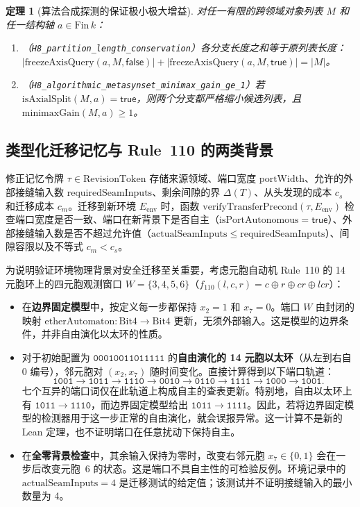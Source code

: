 \documentclass[11pt,a4paper]{article}
\theoremstyle{cleanthm}
\newtheorem{theorem}{定理}[section]
\theoremstyle{cleandef}
\begin{document}
\begin{theorem}[算法合成探测的保证极小极大增益]
\label{thm:h8_metasynset}
对任一有限的跨领域对象列表 $M$ 和任一结构轴 $a\in\mathrm{Fin}\,k$：
\begin{enumerate}
  \item （\texttt{H8\_partition\_\allowbreak length\_\allowbreak conservation}）各分支长度之和等于原列表长度：$|\mathrm{freezeAxisQuery}(a,M,\mathsf{false})| + |\mathrm{freezeAxisQuery}(a,M,\mathsf{true})| = |M|$。
  \item （\texttt{H8\_algorithmic\_\allowbreak metasynset\_\allowbreak minimax\_\allowbreak gain\_\allowbreak ge\_1}）若 $\mathrm{isAxialSplit}(M,a)=\mathsf{true}$，则两个分支都严格缩小候选列表，且 $\mathrm{minimaxGain}(M,a)\ge 1$。
\end{enumerate}
\end{theorem}

\subsection{类型化迁移记忆与 Rule~110 的两类背景}

修正记忆令牌 $\tau\in\mathrm{RevisionToken}$ 存储来源领域、端口宽度 $\mathrm{portWidth}$、允许的外部接缝输入数 $\mathrm{requiredSeamInputs}$、剩余间隙的界 $\Delta(T)$、从头发现的成本 $c_s$ 和迁移成本 $c_m$。迁移到新环境 $E_{\mathrm{env}}$ 时，函数 $\mathrm{verifyTransferPrecond}(\tau,E_{\mathrm{env}})$ 检查端口宽度是否一致、端口在新背景下是否自主（$\mathrm{isPortAutonomous}=\mathsf{true}$）、外部接缝输入数是否不超过允许值（$\mathrm{actualSeamInputs}\le\mathrm{requiredSeamInputs}$）、间隙容限以及不等式 $c_m < c_s$。

为说明验证环境物理背景对安全迁移至关重要，考虑元胞自动机 Rule~110 的 14 元胞环上的四元胞观测窗口 $W=\{3,4,5,6\}$（$f_{110}(l,c,r)=c\oplus r\oplus cr\oplus lcr$）：
\begin{itemize}
  \item 在\textbf{边界固定模型}中，按定义每一步都保持 $x_2=1$ 和 $x_7=0$。端口 $W$ 由封闭的映射 $\mathrm{etherAutomaton}:\mathrm{Bit4}\to\mathrm{Bit4}$ 更新，无须外部输入。这是模型的边界条件，并非自由演化以太环的性质。
  \item 对于初始配置为 $\mathtt{00010011011111}$ 的\textbf{自由演化的 14 元胞以太环}（从左到右自 0 编号），邻元胞对 $(x_2,x_7)$ 随时间变化。直接计算得到以下端口轨道：
\[
\mathtt{1001}\to\mathtt{1011}\to\mathtt{1110}\to\mathtt{0010}\to
\mathtt{0110}\to\mathtt{1111}\to\mathtt{1000}\to\mathtt{1001}.
\]
  七个互异的端口词仅在此轨道上构成自主的查表更新。特别地，自由以太环上有 $\mathtt{1011}\to\mathtt{1110}$，而边界固定模型给出 $\mathtt{1011}\to\mathtt{1111}$。因此，若将边界固定模型的检测器用于这一步正常的自由演化，就会误报异常。这一计算不是新的 Lean 定理，也不证明端口在任意扰动下保持自主。
  \item 在\textbf{全零背景检查}中，其余输入保持为零时，改变右邻元胞 $x_7\in\{0,1\}$ 会在一步后改变元胞~6 的状态。这是端口不具自主性的可检验反例。环境记录中的 $\mathrm{actualSeamInputs}=4$ 是迁移测试的给定值；该测试并不证明接缝输入的最小数量为 4。
\end{itemize}
\end{document}
